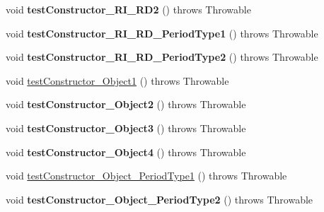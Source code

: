 \begin{DoxyCompactItemize}
\item 
\hypertarget{classorg_1_1joda_1_1time_1_1_test_mutable_period___constructors_abd9114a278d8b9be900937d0e3761dc3}{void {\bfseries test\-Constructor\-\_\-\-R\-I\-\_\-\-R\-D2} ()  throws Throwable }\label{classorg_1_1joda_1_1time_1_1_test_mutable_period___constructors_abd9114a278d8b9be900937d0e3761dc3}

\item 
\hypertarget{classorg_1_1joda_1_1time_1_1_test_mutable_period___constructors_ab7198a2b46479931d16ee04e6d5c8a00}{void {\bfseries test\-Constructor\-\_\-\-R\-I\-\_\-\-R\-D\-\_\-\-Period\-Type1} ()  throws Throwable }\label{classorg_1_1joda_1_1time_1_1_test_mutable_period___constructors_ab7198a2b46479931d16ee04e6d5c8a00}

\item 
\hypertarget{classorg_1_1joda_1_1time_1_1_test_mutable_period___constructors_a65f50dbb5490acf9fd69a13e528bfb98}{void {\bfseries test\-Constructor\-\_\-\-R\-I\-\_\-\-R\-D\-\_\-\-Period\-Type2} ()  throws Throwable }\label{classorg_1_1joda_1_1time_1_1_test_mutable_period___constructors_a65f50dbb5490acf9fd69a13e528bfb98}

\item 
void \hyperlink{classorg_1_1joda_1_1time_1_1_test_mutable_period___constructors_a63e890aa140a71c4cb0fcfbe5dc4bb3f}{test\-Constructor\-\_\-\-Object1} ()  throws Throwable 
\item 
\hypertarget{classorg_1_1joda_1_1time_1_1_test_mutable_period___constructors_ae8bf353030b1e9752430a37b799d9b06}{void {\bfseries test\-Constructor\-\_\-\-Object2} ()  throws Throwable }\label{classorg_1_1joda_1_1time_1_1_test_mutable_period___constructors_ae8bf353030b1e9752430a37b799d9b06}

\item 
\hypertarget{classorg_1_1joda_1_1time_1_1_test_mutable_period___constructors_a3e3947ed7bb30988391ab4451a680a00}{void {\bfseries test\-Constructor\-\_\-\-Object3} ()  throws Throwable }\label{classorg_1_1joda_1_1time_1_1_test_mutable_period___constructors_a3e3947ed7bb30988391ab4451a680a00}

\item 
\hypertarget{classorg_1_1joda_1_1time_1_1_test_mutable_period___constructors_a1bd08311e74ccd3a497ecf1ffc7c6a52}{void {\bfseries test\-Constructor\-\_\-\-Object4} ()  throws Throwable }\label{classorg_1_1joda_1_1time_1_1_test_mutable_period___constructors_a1bd08311e74ccd3a497ecf1ffc7c6a52}

\item 
void \hyperlink{classorg_1_1joda_1_1time_1_1_test_mutable_period___constructors_afa91924fe8ebafe7932b4dc5ce8a99a1}{test\-Constructor\-\_\-\-Object\-\_\-\-Period\-Type1} ()  throws Throwable 
\item 
\hypertarget{classorg_1_1joda_1_1time_1_1_test_mutable_period___constructors_a0c219fa7c3ad50662a0ca6addf21fe6e}{void {\bfseries test\-Constructor\-\_\-\-Object\-\_\-\-Period\-Type2} ()  throws Throwable }\label{classorg_1_1joda_1_1time_1_1_test_mutable_period___constructors_a0c219fa7c3ad50662a0ca6addf21fe6e}


\end{DoxyCompactItemize}
